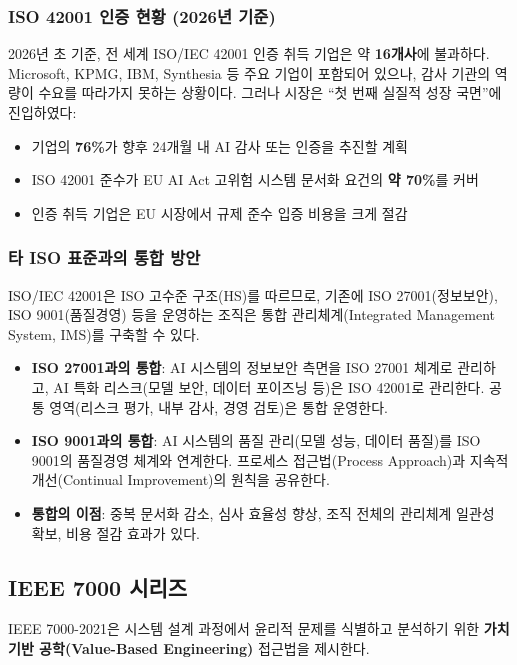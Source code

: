 \subsubsection{ISO 42001 인증 현황 (2026년 기준)}

\begin{tcolorbox}[colback=blue!5, colframe=blue!60, title={ISO 42001 인증 시장 현황 (2026년 초 기준)}]
2026년 초 기준, 전 세계 ISO/IEC 42001 인증 취득 기업은 약 \textbf{16개사}에 불과하다. Microsoft, KPMG, IBM, Synthesia 등 주요 기업이 포함되어 있으나, 감사 기관의 역량이 수요를 따라가지 못하는 상황이다. 그러나 시장은 ``첫 번째 실질적 성장 국면''에 진입하였다:
\begin{itemize}
    \item 기업의 \textbf{76\%}가 향후 24개월 내 AI 감사 또는 인증을 추진할 계획
    \item ISO 42001 준수가 EU AI Act 고위험 시스템 문서화 요건의 \textbf{약 70\%}를 커버
    \item 인증 취득 기업은 EU 시장에서 규제 준수 입증 비용을 크게 절감
\end{itemize}
\end{tcolorbox}

\subsubsection{타 ISO 표준과의 통합 방안}

ISO/IEC 42001은 ISO 고수준 구조(HS)를 따르므로, 기존에 ISO 27001(정보보안), ISO 9001(품질경영) 등을 운영하는 조직은 통합 관리체계(Integrated Management System, IMS)를 구축할 수 있다.

\begin{itemize}
 \item \textbf{ISO 27001과의 통합}: AI 시스템의 정보보안 측면을 ISO 27001 체계로 관리하고, AI 특화 리스크(모델 보안, 데이터 포이즈닝 등)은 ISO 42001로 관리한다. 공통 영역(리스크 평가, 내부 감사, 경영 검토)은 통합 운영한다.
 \item \textbf{ISO 9001과의 통합}: AI 시스템의 품질 관리(모델 성능, 데이터 품질)를 ISO 9001의 품질경영 체계와 연계한다. 프로세스 접근법(Process Approach)과 지속적 개선(Continual Improvement)의 원칙을 공유한다.
 \item \textbf{통합의 이점}: 중복 문서화 감소, 심사 효율성 향상, 조직 전체의 관리체계 일관성 확보, 비용 절감 효과가 있다.
\end{itemize}

\subsection{IEEE 7000 시리즈}
IEEE 7000-2021은 시스템 설계 과정에서 윤리적 문제를 식별하고 분석하기 위한 \textbf{가치 기반 공학(Value-Based Engineering)} 접근법을 제시한다.\cite{ieee2019ead}

